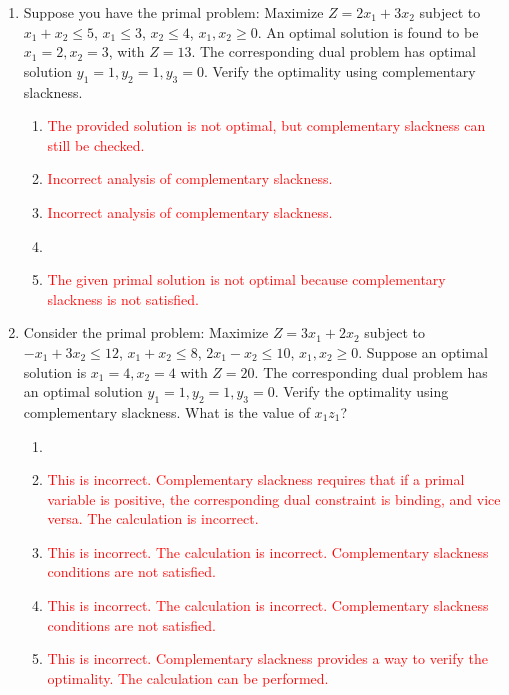 \documentclass{article}%
\newcommand{\incorrect}[1]{\textcolor{red}{#1}}
\begin{document}
\begin{enumerate}
\begin{enumerate}
\item Complementary slackness provides necessary and sufficient conditions for optimality.  It states that for each pair of a primal constraint and its corresponding dual variable, either the constraint is binding (equality holds) or the dual variable is zero, but not both.  The same applies to primal variables and dual constraints.%
\end{enumerate}%
\vspace{1em}%
\item Suppose you have the primal problem: Maximize $Z = 2x_1 + 3x_2$ subject to $x_1 + x_2 \le 5$, $x_1 \le 3$, $x_2 \le 4$, $x_1, x_2 \ge 0$.  An optimal solution is found to be $x_1 = 2, x_2 = 3$, with $Z = 13$.  The corresponding dual problem has optimal solution $y_1 = 1, y_2 = 1, y_3 = 0$. Verify the optimality using complementary slackness.%
\begin{enumerate}%
\item \incorrect{The provided solution is not optimal, but complementary slackness can still be checked.}%
\item \incorrect{Incorrect analysis of complementary slackness.}%
\item \incorrect{Incorrect analysis of complementary slackness.}%
\item \incorrect{}%
\item \incorrect{The given primal solution is not optimal because complementary slackness is not satisfied.}%
\end{enumerate}%
\vspace{1em}%
\item Consider the primal problem: Maximize $Z = 3x_1 + 2x_2$ subject to $-x_1 + 3x_2 \le 12$, $x_1 + x_2 \le 8$, $2x_1 - x_2 \le 10$, $x_1, x_2 \ge 0$.  Suppose an optimal solution is $x_1 = 4, x_2 = 4$ with $Z = 20$. The corresponding dual problem has an optimal solution $y_1 = 1, y_2 = 1, y_3 = 0$. Verify the optimality using complementary slackness. What is the value of $x_1 z_1$?%
\begin{enumerate}%
\item \incorrect{}%
\item \incorrect{This is incorrect.  Complementary slackness requires that if a primal variable is positive, the corresponding dual constraint is binding, and vice versa.  The calculation is incorrect.}%
\item \incorrect{This is incorrect. The calculation is incorrect. Complementary slackness conditions are not satisfied.}%
\item \incorrect{This is incorrect. The calculation is incorrect. Complementary slackness conditions are not satisfied.}%
\item \incorrect{This is incorrect. Complementary slackness provides a way to verify the optimality. The calculation can be performed.}%
\end{enumerate}%
\vspace{1em}%
\end{enumerate}

%
\end{document}
